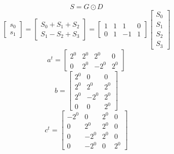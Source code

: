 \documentclass{article}%
\begin{document}
\[%
S = G \odot D%
\]%
\[%
\left[\begin{matrix}s_{0}\\s_{1}\end{matrix}\right] = \left[\begin{matrix}S_{0} + S_{1} + S_{2}\\S_{1} - S_{2} + S_{3}\end{matrix}\right] = \left[\begin{matrix}1 & 1 & 1 & 0\\0 & 1 & -1 & 1\end{matrix}\right] \left[\begin{matrix}S_{0}\\S_{1}\\S_{2}\\S_{3}\end{matrix}\right]%
\]%
\[%
a^{t} = \left[\begin{matrix}2^{0} & 2^{0} & 2^{0} & 0\\0 & 2^{0} & - 2^{0} & 2^{0}\end{matrix}\right]%
\]%
\[%
b = \left[\begin{matrix}2^{0} & 0 & 0\\2^{0} & 2^{0} & 2^{0}\\2^{0} & - 2^{0} & 2^{0}\\0 & 0 & 2^{0}\end{matrix}\right]%
\]%
\[%
c^{t} = \left[\begin{matrix}- 2^{0} & 0 & 2^{0} & 0\\0 & 2^{0} & 2^{0} & 0\\0 & - 2^{0} & 2^{0} & 0\\0 & - 2^{0} & 0 & 2^{0}\end{matrix}\right]%
\]%
\end{document}
